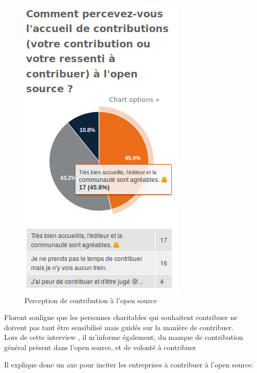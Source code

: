 			\begin{figure}[!htb]
				\center
				\includegraphics[scale=0.58]{./img/a7}
				\caption{Perception de contribution à l'open source}					
			\end{figure}


			Florent  souligne que les personnes charitables qui souhaitent contribuer ne doivent pas tant être sensibilisé mais guidés sur la manière de contribuer.\\

			Lors de cette interview , il m'informe également, du manque de contribution général présent dans l'open source, et de volonté à contribuer

			\begin{center}
				\textit{
				}
			\end{center}

			Il explique donc un axe pour inciter les entreprises à contribuer à l'open source:

			\begin{center}
				\textit{
				}
			\end{center}


